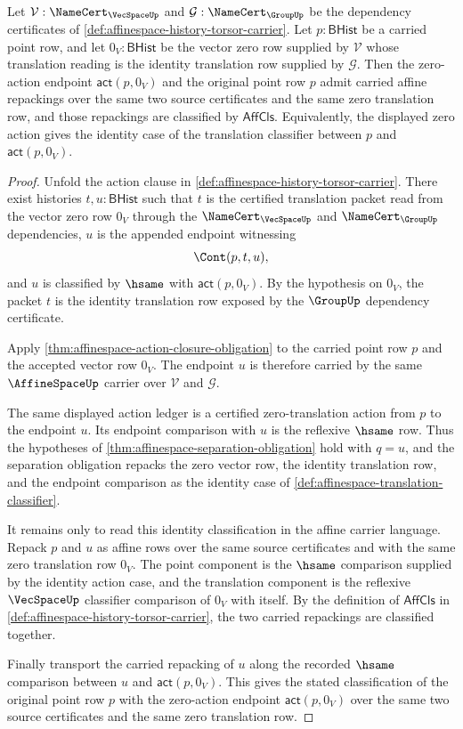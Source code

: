 \begin{theorem}
\label{thm:affinespace-zero-action-classifies-carried-point}
Let $\mathcal{V}:\NameCert_{\VecSpaceUp}$ and $\mathcal{G}:\NameCert_{\GroupUp}$ be the dependency certificates of \autoref{def:affinespace-history-torsor-carrier}. Let $p:\mathsf{BHist}$ be a carried point row, and let $0_V:\mathsf{BHist}$ be the vector zero row supplied by $\mathcal{V}$ whose translation reading is the identity translation row supplied by $\mathcal{G}$. Then the zero-action endpoint $\mathsf{act}(p,0_V)$ and the original point row $p$ admit carried affine repackings over the same two source certificates and the same zero translation row, and those repackings are classified by $\mathsf{AffCls}$. Equivalently, the displayed zero action gives the identity case of the translation classifier between $p$ and $\mathsf{act}(p,0_V)$.
\end{theorem}
\begin{proof}
Unfold the action clause in \autoref{def:affinespace-history-torsor-carrier}. There exist histories $t,u:\mathsf{BHist}$ such that $t$ is the certified translation packet read from the vector zero row $0_V$ through the $\NameCert_{\VecSpaceUp}$ and $\NameCert_{\GroupUp}$ dependencies, $u$ is the appended endpoint witnessing
$$
\Cont(p,t,u),
$$
and $u$ is classified by $\hsame$ with $\mathsf{act}(p,0_V)$. By the hypothesis on $0_V$, the packet $t$ is the identity translation row exposed by the $\GroupUp$ dependency certificate.

Apply \autoref{thm:affinespace-action-closure-obligation} to the carried point row $p$ and the accepted vector row $0_V$. The endpoint $u$ is therefore carried by the same $\AffineSpaceUp$ carrier over $\mathcal{V}$ and $\mathcal{G}$.

The same displayed action ledger is a certified zero-translation action from $p$ to the endpoint $u$. Its endpoint comparison with $u$ is the reflexive $\hsame$ row. Thus the hypotheses of \autoref{thm:affinespace-separation-obligation} hold with $q=u$, and the separation obligation repacks the zero vector row, the identity translation row, and the endpoint comparison as the identity case of \autoref{def:affinespace-translation-classifier}.

It remains only to read this identity classification in the affine carrier language. Repack $p$ and $u$ as affine rows over the same source certificates and with the same zero translation row $0_V$. The point component is the $\hsame$ comparison supplied by the identity action case, and the translation component is the reflexive $\VecSpaceUp$ classifier comparison of $0_V$ with itself. By the definition of $\mathsf{AffCls}$ in \autoref{def:affinespace-history-torsor-carrier}, the two carried repackings are classified together.

Finally transport the carried repacking of $u$ along the recorded $\hsame$ comparison between $u$ and $\mathsf{act}(p,0_V)$. This gives the stated classification of the original point row $p$ with the zero-action endpoint $\mathsf{act}(p,0_V)$ over the same two source certificates and the same zero translation row.
\end{proof}

